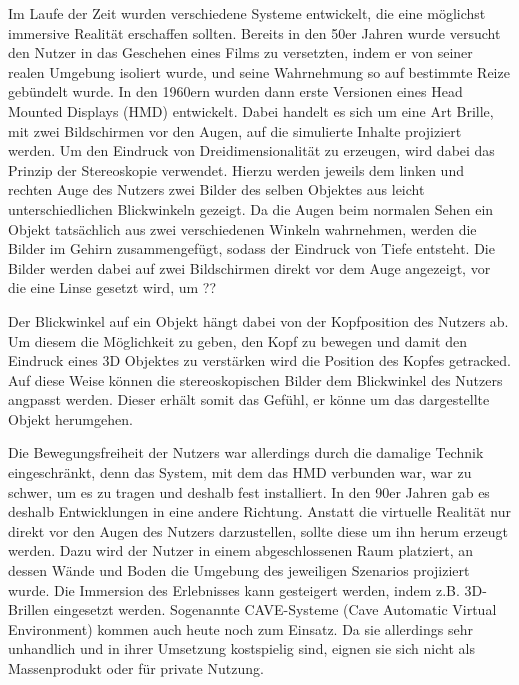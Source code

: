 Im Laufe der Zeit wurden verschiedene Systeme entwickelt, die eine möglichst immersive Realität erschaffen sollten. 
Bereits in den 50er Jahren wurde versucht den Nutzer in das Geschehen eines Films zu versetzten, indem er von seiner realen Umgebung isoliert wurde, und seine Wahrnehmung so auf bestimmte Reize gebündelt wurde. %
In den 1960ern wurden dann erste Versionen eines Head Mounted Displays (HMD) entwickelt. %
Dabei handelt es sich um eine Art Brille, mit zwei Bildschirmen vor den Augen, auf die simulierte Inhalte projiziert werden.
Um den Eindruck von Dreidimensionalität zu erzeugen, wird dabei das Prinzip der Stereoskopie verwendet. Hierzu werden jeweils dem linken und rechten Auge des Nutzers zwei Bilder des selben Objektes aus leicht unterschiedlichen Blickwinkeln  gezeigt. Da die Augen beim normalen Sehen ein Objekt tatsächlich aus zwei verschiedenen Winkeln wahrnehmen, werden die Bilder im Gehirn zusammengefügt, sodass der Eindruck von Tiefe entsteht. Die Bilder werden dabei auf zwei Bildschirmen direkt vor dem Auge angezeigt, vor die eine Linse gesetzt wird, um ??

Der Blickwinkel auf ein Objekt hängt dabei von der Kopfposition des Nutzers ab. Um diesem die Möglichkeit zu geben, den Kopf zu bewegen und damit den Eindruck eines 3D Objektes zu verstärken wird die Position des Kopfes getracked. Auf diese Weise können die stereoskopischen Bilder dem Blickwinkel des Nutzers angpasst werden. Dieser erhält somit das Gefühl, er könne um das dargestellte Objekt herumgehen. 

Die Bewegungsfreiheit der Nutzers war allerdings durch die damalige Technik eingeschränkt, denn das System, mit dem das HMD verbunden war, war zu schwer, um es zu tragen und deshalb fest installiert. 
In den 90er Jahren gab es deshalb Entwicklungen in eine andere Richtung. Anstatt die virtuelle Realität nur direkt vor den Augen des Nutzers darzustellen, sollte diese um ihn herum erzeugt werden. Dazu wird der Nutzer in einem abgeschlossenen Raum platziert, an dessen Wände und Boden die Umgebung des jeweiligen Szenarios projiziert wurde. Die Immersion des Erlebnisses kann gesteigert werden, indem z.B. 3D-Brillen eingesetzt werden. Sogenannte CAVE-Systeme (Cave Automatic Virtual Environment) kommen auch heute noch zum Einsatz. Da sie allerdings sehr unhandlich und in ihrer Umsetzung kostspielig sind, eignen sie sich nicht als Massenprodukt oder für private Nutzung.

